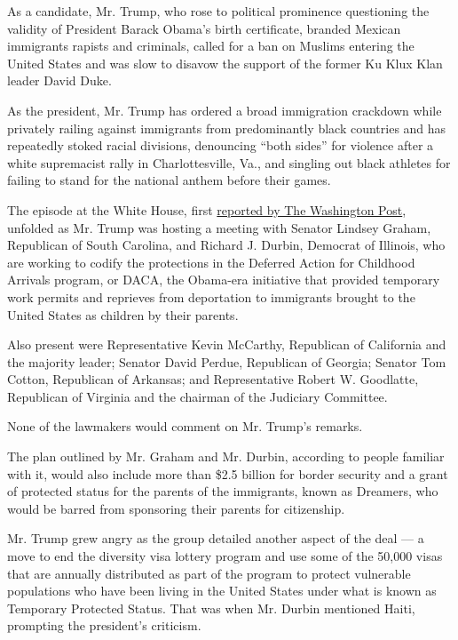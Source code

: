 As a candidate, Mr. Trump, who rose to political prominence questioning
the validity of President Barack Obama's birth certificate, branded
Mexican immigrants rapists and criminals, called for a ban on Muslims
entering the United States and was slow to disavow the support of the
former Ku Klux Klan leader David Duke.

As the president, Mr. Trump has ordered a broad immigration crackdown
while privately railing against immigrants from predominantly black
countries and has repeatedly stoked racial divisions, denouncing ``both
sides'' for violence after a white supremacist rally in Charlottesville,
Va., and singling out black athletes for failing to stand for the
national anthem before their games.

The episode at the White House, first
\href{https://www.washingtonpost.com/politics/trump-attacks-protections-for-immigrants-from-shithole-countries-in-oval-office-meeting/2018/01/11/bfc0725c-f711-11e7-91af-31ac729add94_story.html?utm_term=.8de714470fbf}{reported
by The Washington Post}, unfolded as Mr. Trump was hosting a meeting
with Senator Lindsey Graham, Republican of South Carolina, and Richard
J. Durbin, Democrat of Illinois, who are working to codify the
protections in the Deferred Action for Childhood Arrivals program, or
DACA, the Obama-era initiative that provided temporary work permits and
reprieves from deportation to immigrants brought to the United States as
children by their parents.

Also present were Representative Kevin McCarthy, Republican of
California and the majority leader; Senator David Perdue, Republican of
Georgia; Senator Tom Cotton, Republican of Arkansas; and Representative
Robert W. Goodlatte, Republican of Virginia and the chairman of the
Judiciary Committee.

None of the lawmakers would comment on Mr. Trump's remarks.

The plan outlined by Mr. Graham and Mr. Durbin, according to people
familiar with it, would also include more than \$2.5 billion for border
security and a grant of protected status for the parents of the
immigrants, known as Dreamers, who would be barred from sponsoring their
parents for citizenship.

Mr. Trump grew angry as the group detailed another aspect of the deal
--- a move to end the diversity visa lottery program and use some of the
50,000 visas that are annually distributed as part of the program to
protect vulnerable populations who have been living in the United States
under what is known as Temporary Protected Status. That was when Mr.
Durbin mentioned Haiti, prompting the president's criticism.

